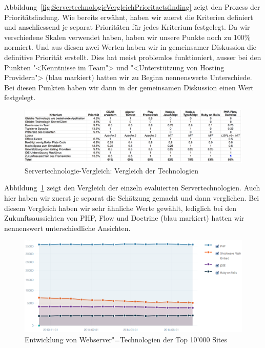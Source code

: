 			Abbildung~\ref{fig:ServertechnologieVergleichPrioritaetsfinding} zeigt den Prozess der Prioritätsfindung.
			Wie bereits erwähnt, haben wir zuerst die Kriterien definiert und 
			anschliessend je separat Prioritäten für jedes Kriterium festgelegt.
			Da wir verschiedene Skalen verwendet haben, haben wir unsere Punkte noch zu 100\% normiert.
			Und aus diesen zwei Werten haben wir in gemeinsamer Diskussion die definitive Priorität erstellt.
			Dies hat meist problemlos funktioniert, ausser bei den Punkten "<Kenntnisse im Team"> und "<Unterstützung von Hosting Providern"> (blau markiert) hatten wir zu Beginn nennenswerte Unterschiede.
			Bei diesen Punkten haben wir dann in der gemeinsamen Diskussion einen Wert festgelegt.
		
			\begin{figure}[H]
				\begin{minipage}[b]{\linewidth}
					\includegraphics[width=\textwidth]{media/spreadsheets/ServertechnologieVergleichVergleichDerTechnologien.pdf}
					\centering
					\caption{Servertechnologie-Vergleich: Vergleich der Technologien}
					\label{fig:ServertechnologieVergleichVergleichDerTechnologien.pdf}
				\end{minipage}
			\end{figure}
			
			Abbildung~\ref{fig:ServertechnologieVergleichVergleichDerTechnologien.pdf} zeigt den Vergleich der einzeln evaluierten Servertechnologien.
			Auch hier haben wir zuerst je separat die Schätzung gemacht und dann verglichen.
			Bei diesem Vergleich haben wir sehr ähnliche Werte gewählt, lediglich bei den Zukunftsaussichten von PHP, Flow und Doctrine (blau markiert) hatten wir nennenswert unterschiedliche Ansichten.
			
			\begin{figure}
					\includegraphics[width=\textwidth]{media/img/EntwicklungVonWebserverTechnologien.png}
					\centering
					\caption{Entwicklung von Webserver"=Technologien der Top 10'000 Sites \cite{builtwith_pty_ltd_framework_2014}}
					\label{fig:EntwicklungVonWebserverTechnologien}
			\end{figure}
			
